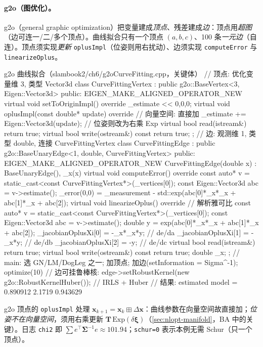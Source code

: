 \paragraph{g2o（图优化）。}\cite{gaoxiang2019slam14}
g2o（general graphic optimization）把变量建成\emph{顶点}、残差建成\emph{边}：顶点用\emph{超图}（边可连一/二/多个顶点）。曲线拟合只有一个顶点 $(a,b,c)$、100 条\emph{一元边}（自连）。顶点须实现\emph{更新} \texttt{oplusImpl}（位姿则用右扰动）、边须实现 \texttt{computeError} 与 \texttt{linearizeOplus}。

\begin{codebox}[C++]{g2o 曲线拟合（slambook2/ch6/g2oCurveFitting.cpp，关键体）}
// 顶点: 优化变量维 3, 类型 Vector3d
class CurveFittingVertex : public g2o::BaseVertex<3, Eigen::Vector3d> {
public:
  EIGEN_MAKE_ALIGNED_OPERATOR_NEW
  virtual void setToOriginImpl() override { _estimate << 0,0,0; }
  virtual void oplusImpl(const double* update) override {     // 向量空间: 直接加
    _estimate += Eigen::Vector3d(update);                     // 位姿则改为右乘 Exp
  }
  virtual bool read(istream&) { return true; }
  virtual bool write(ostream&) const { return true; }
};
// 边: 观测维 1, 类型 double, 连接 CurveFittingVertex
class CurveFittingEdge : public g2o::BaseUnaryEdge<1, double, CurveFittingVertex> {
public:
  EIGEN_MAKE_ALIGNED_OPERATOR_NEW
  CurveFittingEdge(double x) : BaseUnaryEdge(), _x(x) {}
  virtual void computeError() override {
    const auto* v = static_cast<const CurveFittingVertex*>(_vertices[0]);
    const Eigen::Vector3d abc = v->estimate();
    _error(0,0) = _measurement - std::exp(abc[0]*_x*_x + abc[1]*_x + abc[2]);
  }
  virtual void linearizeOplus() override {                    // 解析雅可比
    const auto* v = static_cast<const CurveFittingVertex*>(_vertices[0]);
    const Eigen::Vector3d abc = v->estimate();
    double y = exp(abc[0]*_x*_x + abc[1]*_x + abc[2]);
    _jacobianOplusXi[0] = -_x*_x*y;   // de/da
    _jacobianOplusXi[1] = -_x*y;      // de/db
    _jacobianOplusXi[2] = -y;         // de/dc
  }
  virtual bool read(istream&) { return true; }
  virtual bool write(ostream&) const { return true; }
  double _x;
};
// main: 选 GN/LM/DogLeg 之一; 加顶点; 加边(setInformation = Sigma^-1); optimize(10)
// 边可挂鲁棒核: edge->setRobustKernel(new g2o::RobustKernelHuber());  // IRLS + Huber
// 结果: estimated model = 0.890912 2.1719 0.943629
\end{codebox}

\noindent g2o 顶点的 \texttt{oplusImpl} 处理 $\mathbf{x}_{k+1}=\mathbf{x}_k\boxplus\Delta\mathbf{x}$：曲线参数在向量空间故直接加；\emph{位姿不在向量空间}，须用右乘更新 $\mathbf{T}\,\mathrm{Exp}(\delta\boldsymbol{\xi})$（\cref{sec:nlopt-manifold}，BA 中的关键）。日志 \texttt{chi2} 即 $\sum e^\top\boldsymbol{\Sigma}^{-1}e\approx101.94$；\texttt{schur=0} 表示本例无需 Schur（只一个顶点）。

